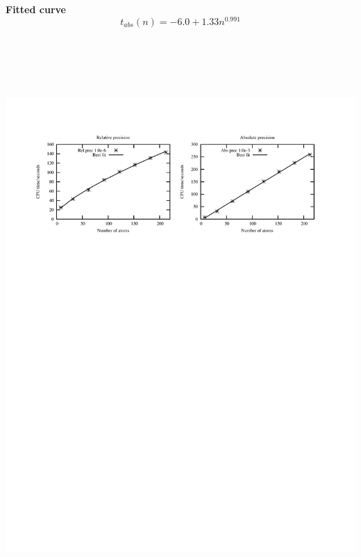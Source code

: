 \documentclass[mathserif, 8pt]{beamer}
\begin{document}
\begin{frame}
\begin{columns}
\begin{column}{.50\textwidth}
\begin{figure}
	\end{figure}
	\textbf{Fitted curve}
	\begin{equation}
	    \nonumber
	    t_{abs}(n) = -6.0 + 1.33n^{0.991}
	\end{equation}
	\ \\
	\ \\
    \end{column}
    \end{columns}    
    \ \\
    \begin{center}
	\includegraphics[scale=0.6, clip, viewport = 50 550 540 730]{figures/linearScaling.pdf}
    \end{center}
\end{frame}
\end{document}

